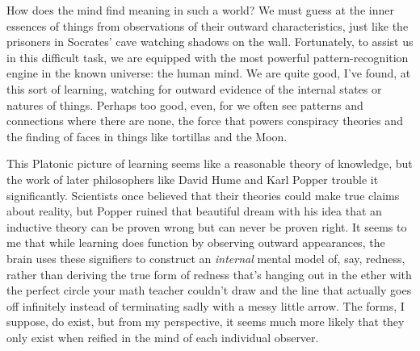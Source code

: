 \documentclass[a4paper,12pt]{article}
\begin{document}

How does the mind find meaning in such a world? We must guess at the inner essences of things from observations of their outward characteristics, just like the prisoners in Socrates' cave watching shadows on the wall. Fortunately, to assist us in this difficult task, we are equipped with the most powerful pattern-recognition engine in the known universe: the human mind. We are quite good, I've found, at this sort of learning, watching for outward evidence of the internal states or natures of things. Perhaps too good, even, for we often see patterns and connections where there are none, the force that powers conspiracy theories and the finding of faces in things like tortillas and the Moon.

This Platonic picture of learning seems like a reasonable theory of knowledge, but the work of later philosophers like David Hume and Karl Popper trouble it significantly. Scientists once believed that their theories could make true claims about reality, but Popper ruined that beautiful dream with his idea that an inductive theory can be proven wrong but can never be proven right. It seems to me that while learning does function by observing outward appearances, the brain uses these signifiers to construct an \textit{internal} mental model of, say, redness, rather than deriving the true form of redness that's hanging out in the ether with the perfect circle your math teacher couldn't draw and the line that actually goes off infinitely instead of terminating sadly with a messy little arrow. The forms, I suppose, do exist, but from my perspective, it seems much more likely that they only exist when reified in the mind of each individual observer.
\end{document}
